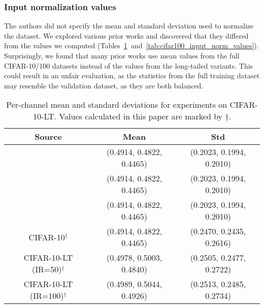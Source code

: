 \subsubsection{Input normalization values}
\label{sec:input_norm_values}

The authors did not specify the mean and standard deviation used to normalize the dataset. We explored various prior works \citep{LDAM-DRW, M2m, MiSLAS} and discovered that they differed from the values we computed (Tables~\ref{tab:cifar10_input_norm_values}~and~\ref{tab:cifar100_input_norm_values}). Surprisingly, we found that many prior works use mean values from the full CIFAR-10/100 datasets instead of the values from the long-tailed variants. This could result in an unfair evaluation, as the statistics from the full training dataset may resemble the validation dataset, as they are both balanced.

\begin{table}[!ht]
    \centering
    \begin{tabular}{c|cc}
        Source & Mean & Std \\ \hline
        \citet{MiSLAS} & (0.4914, 0.4822, 0.4465) & (0.2023, 0.1994, 0.2010) \\
        \citet{LDAM-DRW} & (0.4914, 0.4822, 0.4465) & (0.2023, 0.1994, 0.2010) \\
        \citet{M2m} & (0.4914, 0.4822, 0.4465) & (0.2023, 0.1994, 0.2010) \\ \hline
        CIFAR-10$^{\dagger}$ & (0.4914, 0.4822, 0.4465) & (0.2470, 0.2435, 0.2616) \\ 
        CIFAR-10-LT (IR=50)$^{\dagger}$ & (0.4978, 0.5003, 0.4840) & (0.2505, 0.2477, 0.2722) \\
        CIFAR-10-LT (IR=100)$^{\dagger}$ & (0.4989, 0.5044, 0.4926) & (0.2513, 0.2485, 0.2734) \\
    \end{tabular}
    \caption{Per-channel mean and standard deviations for experiments on CIFAR-10-LT. Values calculated in this paper are marked by $\dagger$.}
    \label{tab:cifar10_input_norm_values}
\end{table}

